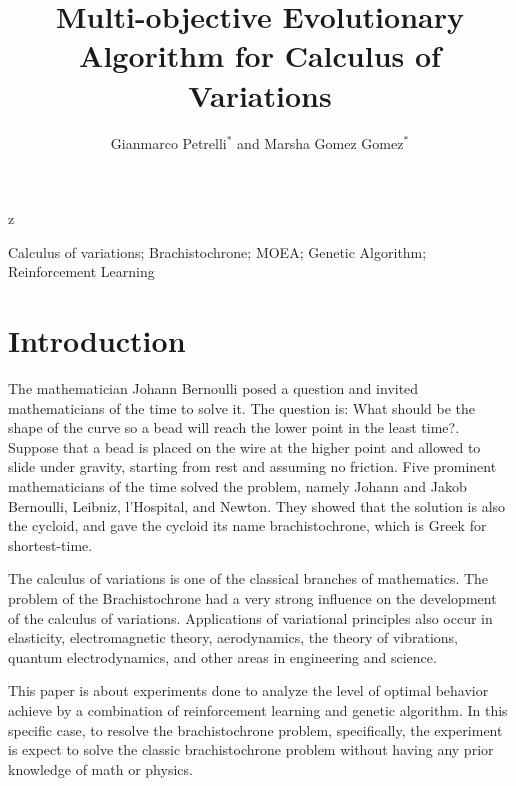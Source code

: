 \documentclass[a4paper, 10pt, twocolumn, twoside]{article}
\begin{document}
\linespread{0.5}

\title{Multi-objective Evolutionary Algorithm for Calculus of Variations}

\author{Gianmarco Petrelli$^{*}$ and Marsha Gomez Gomez$^{*}$}

z
\maketitle 
\thispagestyle{fancy} 
\pagestyle{fancy}


\begin{abstract}

\end{abstract}

\begin{keywords}
Calculus of variations; Brachistochrone; MOEA; Genetic Algorithm; Reinforcement Learning 
\end{keywords}


\section{Introduction}
\label{sec:Introduction}

The mathematician Johann Bernoulli posed a question and invited mathematicians of the time to solve it. The question is: What should be the shape of the curve so a bead will reach the lower point in the least time?. Suppose that a bead is placed on the wire at the higher point and allowed to slide under gravity, starting from rest and assuming no friction. 
Five prominent mathematicians of the time solved the problem, namely Johann and Jakob Bernoulli, Leibniz, l'Hospital, and Newton. They showed that the solution is also the cycloid, and gave the cycloid its name brachistochrone, which is Greek for shortest-time.

The calculus of variations is one of the classical branches of mathematics. The problem of the Brachistochrone had a very strong influence on the development of the calculus of variations. Applications of variational principles also occur in elasticity, electromagnetic theory, aerodynamics, the theory of vibrations, quantum electrodynamics, and other areas in engineering and science.

This paper is about experiments done to analyze the level of optimal behavior achieve by a combination of reinforcement learning and genetic algorithm. In this specific case, to resolve the brachistochrone problem, specifically, the experiment is expect to solve the classic brachistochrone problem without having any prior knowledge of math or physics.
\end{document}
